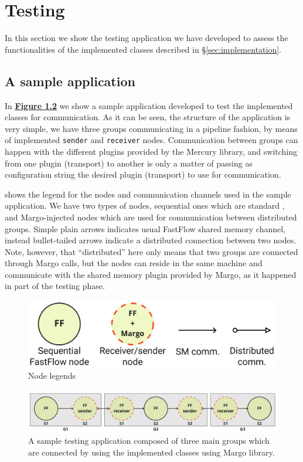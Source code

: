\chapter{Testing}
\label{sec:testing}
In this section we show the testing application we have developed to assess the functionalities of the implemented classes described in \S\ref{sec:implementation}.

\section{A sample application}
In \hyperref[fig:sample-app]{\textbf{Figure \ref{fig:sample-app}}} we show a sample application developed to test the implemented classes for communication. As it can be seen, the structure of the application is very simple, we have three groups communicating in a pipeline fashion, by means of implemented \texttt{sender} and \texttt{receiver} nodes. Communication between groups can happen with the different plugins provided by the Mercury library, and switching from one plugin (transport) to another is only a matter of passing as configuration string the desired plugin (transport) to use for communication.\newline

 shows the legend for the nodes and communication channels used in the sample application. We have two types of nodes, sequential ones which are standard , and Margo-injected nodes which are used for communication between distributed groups. Simple plain arrows indicates usual FastFlow shared memory channel, instead bullet-tailed arrows indicate a distributed connection between two nodes. Note, however, that ``distributed'' here only means that two groups are connected through Margo calls, but the nodes can reside in the same machine and communicate with the shared memory plugin provided by Margo, as it happened in part of the testing phase.

\begin{figure}[H]
    \centering
    \includegraphics[width=0.6\linewidth]{res/node-legends.jpg}
    \caption{Node legends}
    \label{fig:node-legends}
\end{figure}
\begin{figure}[H]
    \centering
    \includegraphics[width=\linewidth]{res/sample-app.jpg}
    \caption{A sample testing application composed of three main groups which are connected by using the implemented classes using Margo library.}
    \label{fig:sample-app}
\end{figure}


